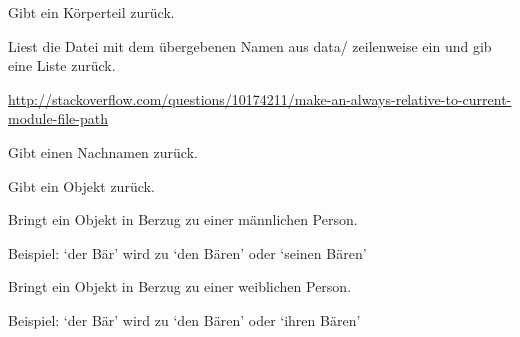\documentclass[a4paper,12pt,oneside]{sphinxmanual}
\begin{document}
\begin{fulllineitems}
\label{funktionen:pyzufall.koerperteil}
Gibt ein Körperteil zurück.

\end{fulllineitems}


\begin{fulllineitems}
\label{funktionen:pyzufall.lese}
Liest die Datei mit dem übergebenen Namen aus data/ zeilenweise ein und gib eine Liste zurück.

\href{http://stackoverflow.com/questions/10174211/make-an-always-relative-to-current-module-file-path}{http://stackoverflow.com/questions/10174211/make-an-always-relative-to-current-module-file-path}

\end{fulllineitems}


\begin{fulllineitems}
\label{funktionen:pyzufall.nachname}
Gibt einen Nachnamen zurück.

\end{fulllineitems}


\begin{fulllineitems}
\label{funktionen:pyzufall.objekt}
Gibt ein Objekt zurück.

\end{fulllineitems}


\begin{fulllineitems}
\label{funktionen:pyzufall.objekt_m}
Bringt ein Objekt in Berzug zu einer männlichen Person.

Beispiel:
`der Bär' wird zu `den Bären' oder `seinen Bären'

\end{fulllineitems}


\begin{fulllineitems}
\label{funktionen:pyzufall.objekt_w}
Bringt ein Objekt in Berzug zu einer weiblichen Person.

Beispiel:
`der Bär' wird zu `den Bären' oder `ihren Bären'

\end{fulllineitems}
\end{document}
